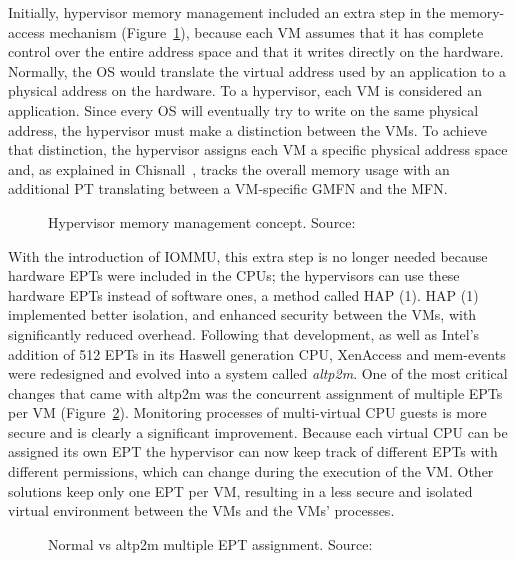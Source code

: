 \par Initially, hypervisor memory management included an extra step in the memory-access mechanism (Figure~\ref{fig:hypmm}), because each \ac{VM} assumes that it has complete control over the entire address space and that it writes directly on the hardware. Normally, the \ac{OS} would translate the virtual address used by an application to a physical address on the hardware. To a hypervisor, each \ac{VM} is considered an application. Since every \ac{OS} will eventually try to write on the same physical address, the hypervisor must make a distinction between the \ac{VM}s. To achieve that distinction, the hypervisor assigns each \ac{VM} a specific physical address space and, as explained in Chisnall~\cite{chisnall2008definitive}, tracks the overall memory usage with an additional \ac{PT} translating between a \ac{VM}-specific \ac{GMFN} and the \ac{MFN}.

\begin{figure}[ht]
	\centering
	
	\caption{Hypervisor memory management concept. Source:~\cite{chisnall2008definitive}}
	\label{fig:hypmm}
\end{figure}

\par With the introduction of \ac{IOMMU}, this extra step is no longer needed because hardware \acp{EPT} were included in the \ac{CPU}s; the hypervisors can use these hardware \acp{EPT} instead of software ones, a method called \ac{HAP (1)}. \ac{HAP (1)} implemented better isolation, and enhanced security between the \acp{VM}, with significantly reduced overhead. Following that development, as well as Intel's addition of 512 \acp{EPT} in its Haswell generation \ac{CPU}, XenAccess and mem-events were redesigned and evolved into a system called \emph{altp2m}. One of the most critical changes that came with altp2m was the concurrent assignment of multiple \ac{EPT}s per \ac{VM} (Figure~\ref{fig:ept}). Monitoring processes of multi-virtual \ac{CPU} guests is more secure and is clearly a significant improvement. Because each virtual \ac{CPU} can be assigned its own \ac{EPT} the hypervisor can now keep track of different \acp{EPT} with different permissions, which can change during the execution of the \ac{VM}. Other solutions keep only one \ac{EPT} per \ac{VM}, resulting in a less secure and isolated virtual environment between the \acp{VM} and the \acp{VM}' processes.

\begin{figure}[ht]
	\centering
	\scalebox{0.95}{}
	\caption{Normal vs altp2m multiple \ac{EPT} assignment. Source:~\cite{xen1}}
	\label{fig:ept}
\end{figure}

